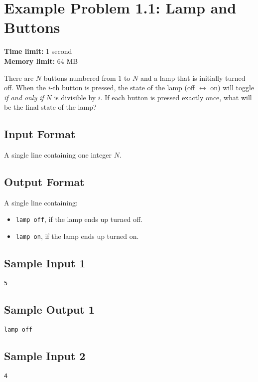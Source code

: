\documentclass[a4paper,12pt]{article}
\begin{document}
\section*{Example Problem 1.1: Lamp and Buttons}

\textbf{Time limit:} 1 second \\
\textbf{Memory limit:} 64 MB

\bigskip

There are $N$ buttons numbered from $1$ to $N$ and a lamp that is initially turned off.  
When the $i$-th button is pressed, the state of the lamp (off $\leftrightarrow$ on) will toggle 
\textit{if and only if} $N$ is divisible by $i$.  
If each button is pressed exactly once, what will be the final state of the lamp?

\subsection*{Input Format}
A single line containing one integer $N$.

\subsection*{Output Format}
A single line containing:
\begin{itemize}
    \item \texttt{lamp off}, if the lamp ends up turned off.
    \item \texttt{lamp on}, if the lamp ends up turned on.
\end{itemize}

\subsection*{Sample Input 1}
\begin{verbatim}
5
\end{verbatim}

\subsection*{Sample Output 1}
\begin{verbatim}
lamp off
\end{verbatim}

\subsection*{Sample Input 2}
\begin{verbatim}
4
\end{verbatim}
\end{document}
